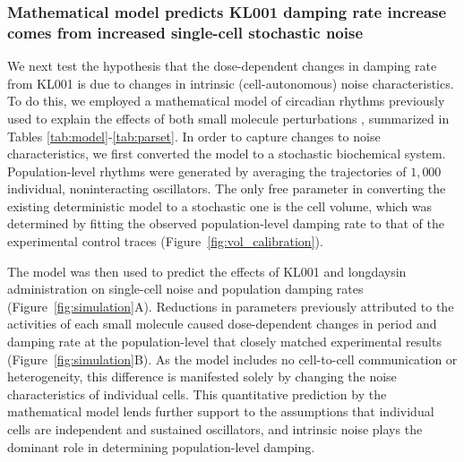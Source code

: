 \documentclass[11pt, letterpaper]{article}
\begin{document}
\subsubsection*{Mathematical model predicts KL001 damping rate increase comes from increased single-cell stochastic noise}

We next test the hypothesis that the dose-dependent changes in damping rate from KL001 is due to changes in intrinsic (cell-autonomous) noise characteristics.
To do this, we employed a mathematical model of circadian rhythms previously used to explain the effects of both small molecule perturbations \cite{St.John2014}, summarized in Tables \ref{tab:model}-\ref{tab:parset}.
In order to capture changes to noise characteristics, we first converted the model to a stochastic biochemical system.
Population-level rhythms were generated by averaging the trajectories of $1,000$ individual, noninteracting oscillators.
The only free parameter in converting the existing deterministic model to a stochastic one is the cell volume, which was determined by fitting the observed population-level damping rate to that of the experimental control traces (Figure~\ref{fig:vol_calibration}).

The model was then used to predict the effects of KL001 and longdaysin administration on single-cell noise and population damping rates (Figure~\ref{fig:simulation}A).
Reductions in parameters previously attributed to the activities of each small molecule caused dose-dependent changes in period and damping rate at the population-level that closely matched experimental results (Figure~\ref{fig:simulation}B).
As the model includes no cell-to-cell communication or heterogeneity, this difference is manifested solely by changing the noise characteristics of individual cells.
This quantitative prediction by the mathematical model lends further support to the assumptions that individual cells are independent and sustained oscillators, and intrinsic noise plays the dominant role in determining population-level damping.
\end{document}
